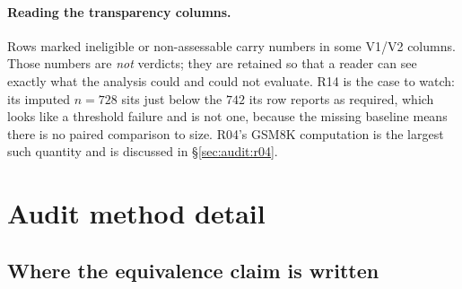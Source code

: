 \paragraph{Reading the transparency columns.} Rows marked ineligible or
non-assessable carry numbers in some V1/V2 columns. Those numbers are \emph{not}
verdicts; they are retained so that a reader can see exactly what the analysis
could and could not evaluate. R14 is the case to watch: its imputed $n = 728$
sits just below the $742$ its row reports as required, which looks like a
threshold failure and is not one, because the missing baseline means there is no
paired comparison to size. R04's GSM8K computation is the largest such quantity
and is discussed in \S\ref{sec:audit:r04}.

\section{Audit method detail}
\label{app:audit-method}


\subsection{Where the equivalence claim is written}
\label{app:audit:locus}

